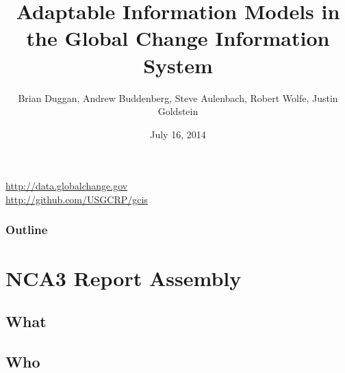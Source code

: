 \documentclass{beamer}
\begin{document}
\title[Adaptable GCIS Information Models]{Adaptable Information Models in the Global Change Information System}
\author[Duggan et al]{
    Brian Duggan,
    Andrew Buddenberg,
    Steve Aulenbach,
    Robert Wolfe,
    Justin Goldstein
}
\date{July 16, 2014} 

\begingroup
\makeatletter
\setlength{\hoffset}{-.5\beamer@sidebarwidth}
\makeatother

\begin{frame}[plain]
\titlepage
\begin{center}
\url{http://data.globalchange.gov}\\
\url{http://github.com/USGCRP/gcis}
\end{center}
\end{frame}

\begin{frame}[plain]
\frametitle{Outline}\tableofcontents 
\end{frame}
\endgroup

\section{NCA3 Report Assembly}



\subsection{What}

\subsection{Who}
\end{document}
